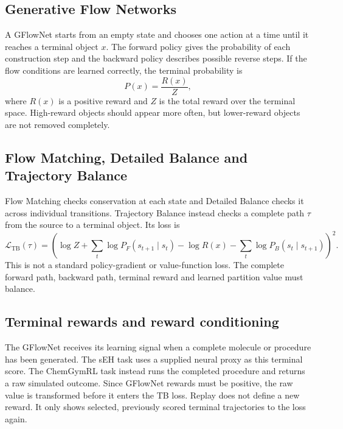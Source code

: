 \documentclass{article}
\begin{document}
\subsection{Generative Flow Networks}

A GFlowNet starts from an empty state and chooses one action at a time until it reaches a terminal object $x$. The forward policy gives the probability of each construction step and the backward policy describes possible reverse steps. If the flow conditions are learned correctly, the terminal probability is
\begin{equation}
P(x)=\frac{R(x)}{Z},
\end{equation}
where $R(x)$ is a positive reward and $Z$ is the total reward over the terminal space. High-reward objects should appear more often, but lower-reward objects are not removed completely.

\subsection{Flow Matching, Detailed Balance and Trajectory Balance}

Flow Matching checks conservation at each state and Detailed Balance checks it across individual transitions. Trajectory Balance instead checks a complete path $\tau$ from the source to a terminal object. Its loss is
\begin{equation}
\mathcal{L}_{\mathrm{TB}}(\tau)=\left(
\log Z+\sum_t\log P_F(s_{t+1}\mid s_t)
-\log R(x)-\sum_t\log P_B(s_t\mid s_{t+1})
\right)^2.
\end{equation}
This is not a standard policy-gradient or value-function loss. The complete forward path, backward path, terminal reward and learned partition value must balance.

\subsection{Terminal rewards and reward conditioning}

The GFlowNet receives its learning signal when a complete molecule or procedure has been generated. The sEH task uses a supplied neural proxy as this terminal score. The ChemGymRL task instead runs the completed procedure and returns a raw simulated outcome. Since GFlowNet rewards must be positive, the raw value is transformed before it enters the TB loss. Replay does not define a new reward. It only shows selected, previously scored terminal trajectories to the loss again.
\end{document}
